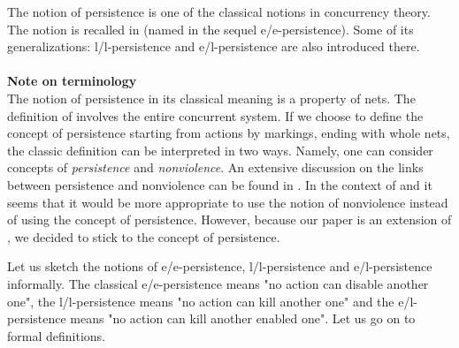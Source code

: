 \documentclass[a4paper]{llncs}
\begin{document}
The notion of persistence is one of the classical notions in concurrency theory. The notion is recalled in \cite{BarOch} (named in the sequel e/e-persistence). Some of its generalizations: l/l-persistence and e/l-persistence are also introduced there.
\\ \\
\textbf{Note on terminology}\\
The notion of persistence in its classical meaning is a property of nets. The definition of \cite{LandRob} involves the entire concurrent system. 
If we choose to define the concept of persistence starting from actions by markings, ending with whole nets, the classic definition can be interpreted in two ways. Namely, one can consider concepts of \emph{persistence} and \emph{nonviolence}. An extensive discussion on the links between persistence and nonviolence can be found in \cite{Koutny}. In the context of \cite{BarMikOch} and  \cite{Koutny} it seems that it would be more appropriate to use the notion of nonviolence instead of using the concept of persistence. However, because our paper is an extension of \cite{BarOch}, we decided to stick to the concept of persistence.


\newpage
Let us sketch the notions of e/e-persistence, l/l-persistence and e/l-persistence informally. The classical e/e-persistence means "no action can disable another one", the l/l-persistence means "no action can kill another one" and the e/l-persistence means "no action can kill another enabled one". Let us go on to formal definitions.
\end{document}
